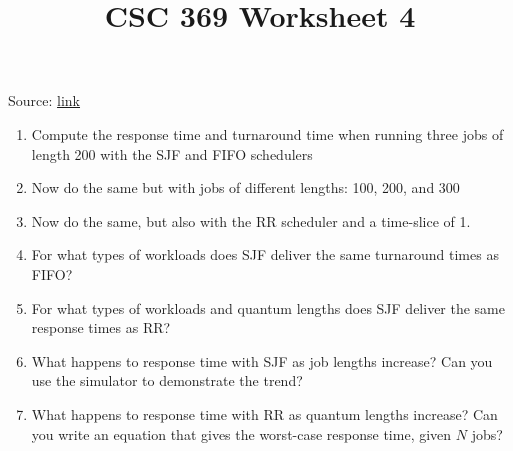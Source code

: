\documentclass[12pt]{article}
\begin{document}
\title{CSC 369 Worksheet 4}
\maketitle

\bigskip

Source: \href{http://pages.cs.wisc.edu/~remzi/Classes/537/Spring2018/Book/cpu-sched.pdf}{link}

\bigskip

\begin{enumerate}[1.]
    \item Compute the response time and turnaround time when running
    three jobs of length 200 with the SJF and FIFO schedulers

    \item Now do the same but with jobs of different lengths: 100, 200, and 300

    \item Now do the same, but also with the RR scheduler and a time-slice of 1.

    \item For what types of workloads does SJF deliver the same turnaround
    times as FIFO?

    \item  For what types of workloads and quantum lengths does SJF deliver
    the same response times as RR?

    \item What happens to response time with SJF as job lengths increase?
    Can you use the simulator to demonstrate the trend?

    \item What happens to response time with RR as quantum lengths increase? Can
    you write an equation that gives the worst-case response time, given $N$ jobs?
\end{enumerate}
\end{document}
